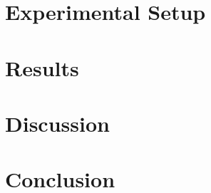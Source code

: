 \documentclass[manuscript,screen,review]{acmart}
\begin{document}
\section{Experimental Setup}
\label{sec:setup}


\section{Results}
\label{sec:results}




\section{Discussion}
\label{sec:discussion}


\section{Conclusion}
\label{sec:conclusion}


\begin{acks}
\end{acks}



\end{document}
